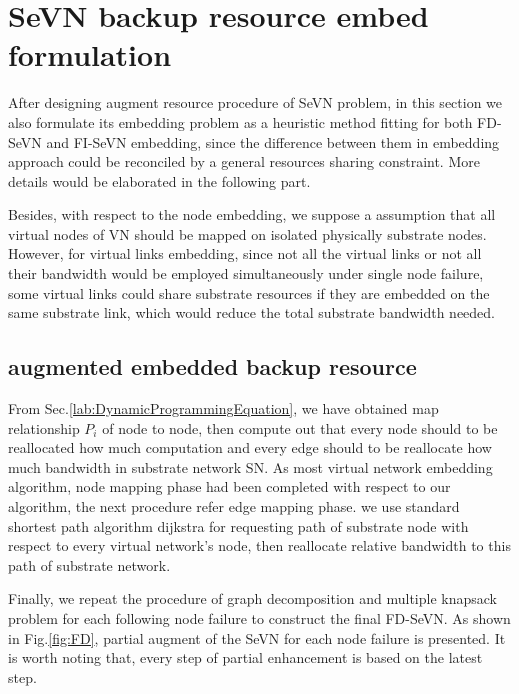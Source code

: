 \section{SeVN backup resource embed formulation}
After designing augment resource procedure of SeVN problem, in this section we also formulate its embedding problem as a heuristic method fitting for both FD-SeVN and FI-SeVN embedding, since the difference between them in embedding approach could be reconciled by a general resources sharing constraint. More details would be elaborated in the following part.

Besides, with respect to the node embedding, we suppose a assumption that all virtual nodes of VN should be mapped on isolated physically substrate nodes. However, for virtual links embedding, since not all the virtual links or not all their bandwidth would be employed simultaneously under single node failure, some virtual links could share substrate resources if they are embedded on the same substrate link, which would reduce the total substrate bandwidth needed.


\subsection{augmented embedded backup resource}
From Sec.\ref{lab:DynamicProgrammingEquation}, we have obtained map relationship $P_i$ of node to node, then compute out that every node should to be reallocated how much computation and every edge should to be reallocate how much bandwidth in substrate network SN. As most virtual network embedding algorithm, node mapping phase had been completed with respect to our algorithm, the next procedure refer edge mapping phase. we use standard shortest path algorithm dijkstra for requesting path of substrate node with respect to every virtual network's node, then reallocate relative bandwidth to this path of substrate network.


Finally, we repeat the procedure of graph decomposition and multiple knapsack problem for each following node failure to construct the final FD-SeVN. As shown in Fig.\ref{fig:FD}, partial augment of the SeVN for each node failure is presented. It is
worth noting that, every step of partial enhancement is based on the latest step.


